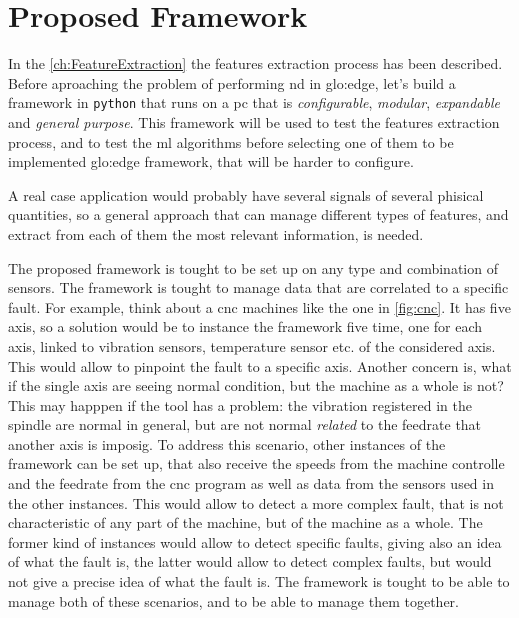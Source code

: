\chapter{Proposed Framework}
\label{ch:Framework}

In the \autoref{ch:FeatureExtraction} the features extraction process has been described. Before aproaching the problem of performing \gls{nd} in \gls{glo:edge}, let's build a framework in \texttt{python} that runs on a \gls{pc} that is \emph{configurable}, \emph{modular}, \emph{expandable} and \emph{general purpose}. This framework will be used to test the features extraction process, and to test the \gls{ml} algorithms before selecting one of them to be implemented \gls{glo:edge} framework, that will be harder to configure.

A real case application would probably have several signals of several phisical quantities, so a general approach that can manage different types of features, and extract from each of them the most relevant information, is needed.

The proposed framework is tought to be set up on any type and combination of sensors. The framework is tought to manage data that are correlated to a specific fault. For example, think about a \gls{cnc} machines like the one in \autoref{fig:cnc}. It has five axis, so a solution would be to instance the framework five time, one for each axis, linked to vibration sensors, temperature sensor etc. of the considered axis. This would allow to pinpoint the fault to a specific axis. Another concern is, what if the single axis are seeing normal condition, but the machine as a whole is not? This may happpen if the tool has a problem: the vibration registered in the spindle are normal in general, but are not normal \emph{related} to the feedrate that another axis is imposig. To address this scenario, other instances of the framework can be set up, that also receive the speeds from the machine controlle and the feedrate from the \gls{cnc} program as well as data from the sensors used in the other instances. This would allow to detect a more complex fault, that is not characteristic of any part of the machine, but of the machine as a whole. The former kind of instances would allow to detect specific faults, giving also an idea of what the fault is, the latter would allow to detect complex faults, but would not give a precise idea of what the fault is. The framework is tought to be able to manage both of these scenarios, and to be able to manage them together.

